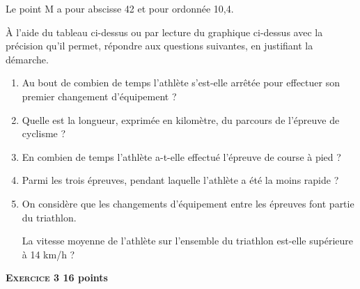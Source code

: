 \documentclass[11pt]{article}
\begin{document}
Le point M a pour abscisse 42 et pour ordonnée 10,4.
	
À l’aide du tableau ci-dessus ou par lecture du graphique ci-dessus avec la précision qu’il permet, répondre aux questions suivantes, en justifiant la démarche.

\medskip
	
	\begin{enumerate}
		\item Au bout de combien de temps l’athlète s’est-elle arrêtée pour effectuer son premier changement d'équipement ?
		\item Quelle est la longueur, exprimée en kilomètre, du parcours de l'épreuve de cyclisme ?
		\item En combien de temps l’athlète a-t-elle effectué l'épreuve de course à pied ?
		\item Parmi les trois épreuves, pendant laquelle l’athlète a été la moins rapide ?
		\item On considère que les changements d'équipement entre les épreuves font partie du triathlon.
		
La vitesse moyenne de l’athlète sur l’ensemble du triathlon est-elle supérieure à 14 km/h ?
	\end{enumerate}
	
\newpage
	
\textbf{{\large \textsc{Exercice 3}} \hfill 16 points}
	
\end{document}
